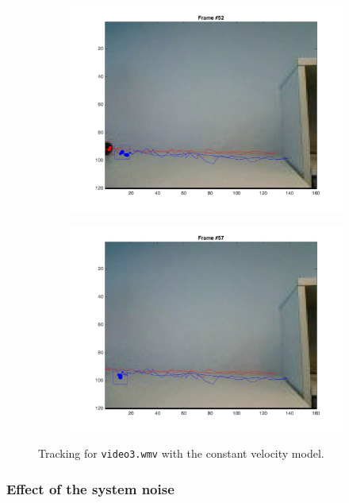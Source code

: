 \documentclass{ethz_report}
\begin{document}
\begin{figure}[h]
\begin{subfigure}[b]{.25\textwidth}
        \includegraphics[width=1\linewidth]{images/video3_model_51}
    \end{subfigure}%
    \begin{subfigure}[b]{.25\textwidth}
        \centering
        \includegraphics[width=1\linewidth]{images/video3_model_56}
    \end{subfigure}
    \caption{Tracking for \texttt{video3.wmv} with the constant velocity model.}
    \label{fig:tracking_video3_model}
\end{figure}

\subsubsection*{Effect of the system noise}
\end{document}
